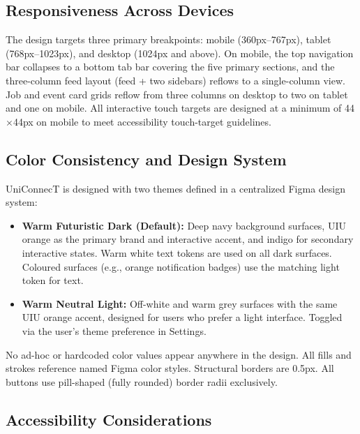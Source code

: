 \documentclass[12pt, a4paper]{article}
\begin{document}
\subsection{Responsiveness Across Devices}

The design targets three primary breakpoints: mobile (360px--767px), tablet
(768px--1023px), and desktop (1024px and above). On mobile, the top navigation bar
collapses to a bottom tab bar covering the five primary sections, and the three-column
feed layout (feed + two sidebars) reflows to a single-column view. Job and event card
grids reflow from three columns on desktop to two on tablet and one on mobile. All
interactive touch targets are designed at a minimum of 44$\times$44px on mobile to
meet accessibility touch-target guidelines.

\subsection{Color Consistency and Design System}

UniConnecT is designed with two themes defined in a centralized Figma design system:

\begin{itemize}
    \item \textbf{Warm Futuristic Dark (Default):} Deep navy background surfaces,
    UIU orange as the primary brand and interactive accent, and indigo for secondary
    interactive states. Warm white text tokens are used on all dark surfaces. Coloured
    surfaces (e.g., orange notification badges) use the matching light token for text.

    \item \textbf{Warm Neutral Light:} Off-white and warm grey surfaces with the same
    UIU orange accent, designed for users who prefer a light interface. Toggled via the
    user's theme preference in Settings.
\end{itemize}

No ad-hoc or hardcoded color values appear anywhere in the design. All fills and
strokes reference named Figma color styles. Structural borders are 0.5px. All
buttons use pill-shaped (fully rounded) border radii exclusively.

\subsection{Accessibility Considerations}
\end{document}
